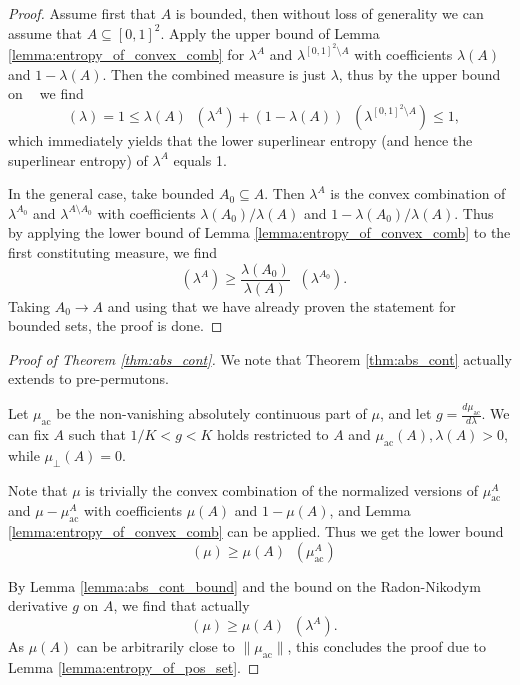 \documentclass[11pt]{article}
\newcommand{\uppersupent}{\mathop{\overline{H}^{\mathrm{superlin}}}}
\newcommand{\lowersupent}{\mathop{\underline{H}^{\mathrm{superlin}}}}
\newcommand{\supent}{\mathop{H^{\mathrm{superlin}}}}
\theoremstyle{definition}
\begin{document}
\begin{proof}
    Assume first that $A$ is bounded, then without loss of generality we can assume that $A\subseteq [0, 1]^2$. Apply the upper bound of Lemma \ref{lemma:entropy_of_convex_comb} for $\lambda^A$ and $\lambda^{[0, 1]^2\setminus A}$ with coefficients $\lambda(A)$ and $1-\lambda(A)$. Then the combined measure is just $\lambda$, thus by the upper bound on $\lowersupent$ we find
    $$\supent(\lambda) = 1\leq \lambda(A)\lowersupent(\lambda^A) + (1-\lambda(A))\uppersupent(\lambda^{[0, 1]^2\setminus A})\leq 1,$$
    which immediately yields that the lower superlinear entropy (and hence the superlinear entropy) of $\lambda^A$ equals 1.

    In the general case, take bounded $A_0\subseteq A$. Then $\lambda^A$ is the convex combination of $\lambda^{A_0}$ and $\lambda^{A \setminus A_0}$ with coefficients $\lambda(A_0)/\lambda(A)$ and $1-\lambda(A_0)/\lambda(A)$. Thus by applying the lower bound of Lemma \ref{lemma:entropy_of_convex_comb} to the first constituting measure, we find
    $$\lowersupent(\lambda^A)\geq \frac{\lambda(A_0)}{\lambda(A)}\supent(\lambda^{A_0}).$$
    Taking $A_0\to A$ and using that we have already proven the statement for bounded sets, the proof is done.
\end{proof}

\begin{proof}[Proof of Theorem \ref{thm:abs_cont}]

    We note that Theorem \ref{thm:abs_cont} actually extends to pre-permutons.

    Let $\mu_{\mathrm{ac}}$ be the non-vanishing absolutely continuous part of $\mu$, and let $g=\frac{d\mu_{\mathrm{ac}}}{d\lambda}$. We can fix $A$ such that $1/K<g<K$ holds restricted to $A$ and $\mu_{\mathrm{ac}}(A), \lambda(A)>0$, while $\mu_{\bot}(A)=0$.

    Note that $\mu$ is trivially the convex combination of the normalized versions of $\mu_{\mathrm{ac}}^A$ and $\mu-\mu_{\mathrm{ac}}^A$ with coefficients $\mu(A)$ and $1-\mu(A)$, and Lemma \ref{lemma:entropy_of_convex_comb} can be applied. Thus we get the lower bound
    $$\lowersupent(\mu)\geq \mu(A)\lowersupent(\mu_{\mathrm{ac}}^A)$$

    By Lemma \ref{lemma:abs_cont_bound} and the bound on the Radon-Nikodym derivative $g$ on $A$, we find
    that actually
    $$\lowersupent(\mu)\geq \mu(A)\lowersupent(\lambda^A).$$
    As $\mu(A)$ can be arbitrarily close to $\|\mu_{\mathrm{ac}}\|$, this concludes the proof due to Lemma \ref{lemma:entropy_of_pos_set}.
    
\end{proof}
\end{document}
